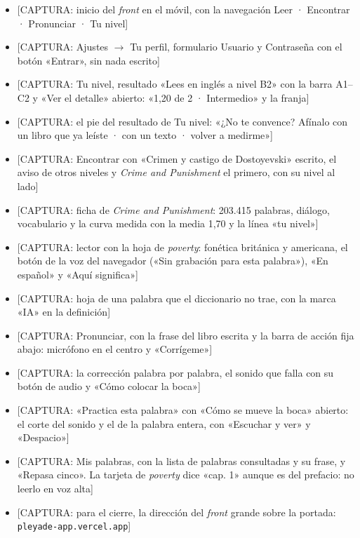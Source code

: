 \documentclass[11pt,a4paper]{article}
\begin{document}
\begin{ve}
\begin{itemize}
  \item {}[CAPTURA: inicio del \emph{front} en el móvil, con la navegación Leer ·
        Encontrar · Pronunciar · Tu nivel]
  \item {}[CAPTURA: Ajustes $\rightarrow$ Tu perfil, formulario Usuario y
        Contraseña con el botón «Entrar», sin nada escrito]
  \item {}[CAPTURA: Tu nivel, resultado «Lees en inglés a nivel B2» con la barra
        A1--C2 y «Ver el detalle» abierto: «1,20 de 2 · Intermedio» y la franja]
  \item {}[CAPTURA: el pie del resultado de Tu nivel: «¿No te convence? Afínalo
        con un libro que ya leíste · con un texto · volver a medirme»]
  \item {}[CAPTURA: Encontrar con «Crimen y castigo de Dostoyevski» escrito, el aviso
        de otros niveles y \emph{Crime and Punishment} el primero, con su nivel al lado]
  \item {}[CAPTURA: ficha de \emph{Crime and Punishment}: 203.415 palabras,
        diálogo, vocabulario y la curva medida con la media 1,70 y la línea «tu
        nivel»]
  \item {}[CAPTURA: lector con la hoja de \emph{poverty}: fonética británica y
        americana, el botón de la voz del navegador («Sin grabación para esta
        palabra»), «En español» y «Aquí significa»]
  \item {}[CAPTURA: hoja de una palabra que el diccionario no trae, con la marca
        «IA» en la definición]
  \item {}[CAPTURA: Pronunciar, con la frase del libro escrita y la barra de
        acción fija abajo: micrófono en el centro y «Corrígeme»]
  \item {}[CAPTURA: la corrección palabra por palabra, el sonido que falla con su
        botón de audio y «Cómo colocar la boca»]
  \item {}[CAPTURA: «Practica esta palabra» con «Cómo se mueve la boca» abierto:
        el corte del sonido y el de la palabra entera, con «Escuchar y ver» y
        «Despacio»]
  \item {}[CAPTURA: Mis palabras, con la lista de palabras consultadas y su
        frase, y «Repasa cinco». La tarjeta de \emph{poverty} dice «cap. 1» aunque
        es del prefacio: no leerlo en voz alta]
  \item {}[CAPTURA: para el cierre, la dirección del \emph{front} grande sobre la
        portada: \texttt{pleyade-app.vercel.app}]
\end{itemize}
\end{ve}
\end{document}

